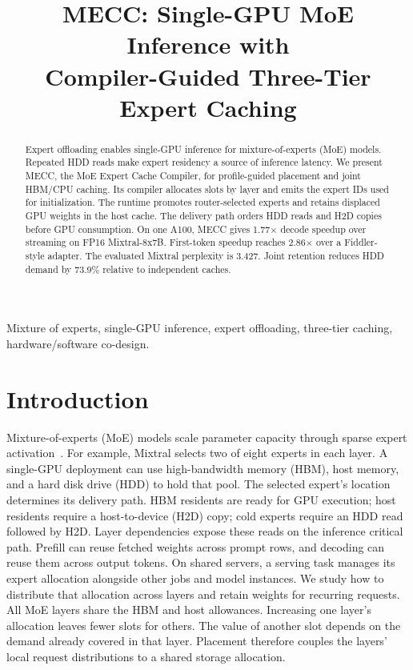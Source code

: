 \documentclass[conference,9pt,letterpaper]{IEEEtran}
\title{MECC: Single-GPU MoE Inference with\protect\\Compiler-Guided Three-Tier Expert Caching}
\author{}
\begin{document}
\maketitle\flushbottom
\begin{abstract}
Expert offloading enables single-GPU inference for mixture-of-experts (MoE) models. Repeated HDD reads make expert residency a source of inference latency. We present MECC, the MoE Expert Cache Compiler, for profile-guided placement and joint HBM/CPU caching. Its compiler allocates slots by layer and emits the expert IDs used for initialization. The runtime promotes router-selected experts and retains displaced GPU weights in the host cache. The delivery path orders HDD reads and H2D copies before GPU consumption. On one A100, MECC gives 1.77$\times$ decode speedup over streaming on FP16 Mixtral-8x7B. First-token speedup reaches 2.86$\times$ over a Fiddler-style adapter. The evaluated Mixtral perplexity is 3.427. Joint retention reduces HDD demand by 73.9\% relative to independent caches.
\end{abstract}

\begin{IEEEkeywords}
Mixture of experts, single-GPU inference, expert offloading, three-tier caching, hardware/software co-design.
\end{IEEEkeywords}

\section{Introduction}
Mixture-of-experts (MoE) models scale parameter capacity through sparse expert activation~\cite{shazeer,switch,mixtral,deepseekmoe}. For example, Mixtral selects two of eight experts in each layer. A single-GPU deployment can use high-bandwidth memory (HBM), host memory, and a hard disk drive (HDD) to hold that pool. The selected expert's location determines its delivery path. HBM residents are ready for GPU execution; host residents require a host-to-device (H2D) copy; cold experts require an HDD read followed by H2D. Layer dependencies expose these reads on the inference critical path. Prefill can reuse fetched weights across prompt rows, and decoding can reuse them across output tokens. On shared servers, a serving task manages its expert allocation alongside other jobs and model instances. We study how to distribute that allocation across layers and retain weights for recurring requests. All MoE layers share the HBM and host allowances. Increasing one layer's allocation leaves fewer slots for others. The value of another slot depends on the demand already covered in that layer. Placement therefore couples the layers' local request distributions to a shared storage allocation.
\end{document}
